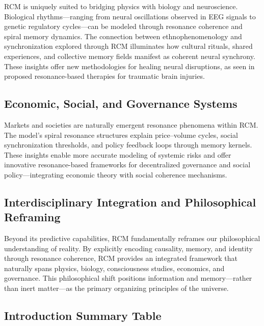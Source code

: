 RCM is uniquely suited to bridging physics with biology and neuroscience. Biological rhythms—ranging from neural oscillations observed in EEG signals to genetic regulatory cycles—can be modeled through resonance coherence and spiral memory dynamics. The connection between ethnophenomenology and synchronization explored through RCM illuminates how cultural rituals, shared experiences, and collective memory fields manifest as coherent neural synchrony. These insights offer new methodologies for healing neural disruptions, as seen in proposed resonance-based therapies for traumatic brain injuries.

\subsection{Economic, Social, and Governance Systems}

Markets and societies are naturally emergent resonance phenomena within RCM. The model’s spiral resonance structures explain price–volume cycles, social synchronization thresholds, and policy feedback loops through memory kernels. These insights enable more accurate modeling of systemic risks and offer innovative resonance-based frameworks for decentralized governance and social policy—integrating economic theory with social coherence mechanisms.

\subsection{Interdisciplinary Integration and Philosophical Reframing}

Beyond its predictive capabilities, RCM fundamentally reframes our philosophical understanding of reality. By explicitly encoding causality, memory, and identity through resonance coherence, RCM provides an integrated framework that naturally spans physics, biology, consciousness studies, economics, and governance. This philosophical shift positions information and memory—rather than inert matter—as the primary organizing principles of the universe.

\subsection{Introduction Summary Table}


